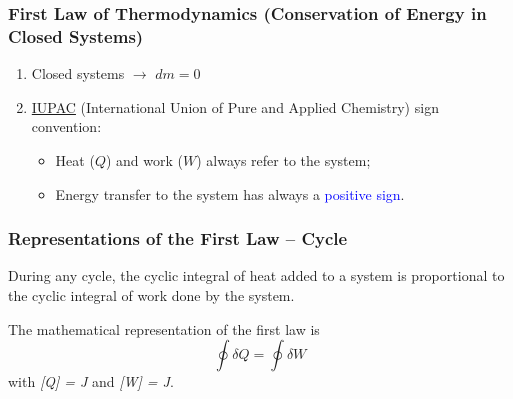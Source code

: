\documentclass[10pt,compress]{beamer}
\begin{document}
\begin{frame}
 \frametitle{First Law of Thermodynamics (Conservation of Energy in Closed Systems)}
   \begin{enumerate} 
      \item<1-> Closed systems $\longrightarrow$ $dm = 0$
      \item<2-> \href{http://www.iupac.org/}{IUPAC} (International Union of Pure and Applied Chemistry) sign convention:
         \begin{itemize}
            \item<2-> Heat ($Q$) and work ($W$)  always refer to the system;
            \item<2-> Energy transfer to the system has always a \textcolor{blue}{positive sign}.
         \end{itemize}
   \end{enumerate}
\normalsize
\end{frame}


\begin{frame}
 \frametitle{Representations of the First Law -- Cycle}

 \begin{block}{}During any cycle, the cyclic integral of heat added to a system is proportional to the cyclic integral of work done by the system.\end{block}

 The mathematical representation of the first law is
 \begin{equation}
  \displaystyle\oint \delta Q = \displaystyle\oint \delta W
  \label{Module00:first_law}
 \end{equation}
 with {\it [Q] = J} and {\it [W] = J}.

\end{frame}
\end{document}
